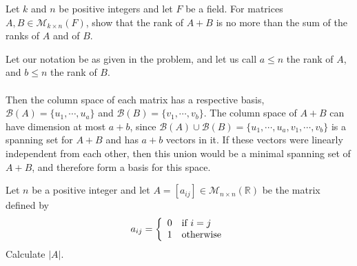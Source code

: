 \documentclass{article}
\begin{document}
\setcounter{problem}{621}
\begin{problem}
Let $k$ and $n$ be positive integers and let $F$ be a field. For matrices $A,B \in \mathcal{M}_{k\times n}(F)$, show that the rank of $A+B$ is no more than the sum of the ranks of $A$ and of $B$.
\end{problem}

\begin{solution}
Let our notation be as given in the problem, and let us call $a\le n$ the rank of $A$, and $b\le n$ the rank of $B$. 

\paragraph{}
Then the column space of each matrix has a respective basis, $\mathcal{B}(A) = \{ u_{1},\cdots,u_{a} \}$ and $\mathcal{B}(B) = \{ v_{1},\cdots,v_{b} \}$. The column space of $A+B$ can have dimension at most $a+b$, since $\mathcal{B}(A) \cup \mathcal{B}(B) =  \{ u_{1},\cdots,u_{a} ,v_{1},\cdots,v_{b} \}$ is a spanning set for $A+B$ and has $a+b$ vectors in it. If these vectors were linearly independent from each other, then this union would be a minimal spanning set of $A+B$, and therefore form a basis for this space.
\end{solution}

\setcounter{section}{11}
\setcounter{problem}{669}
\begin{problem}
Let $n$ be a positive integer and let $A=[a_{ij}] \in \mathcal{M}_{n\times n}(\mathbb{R})$ be the matrix defined by
\[
a_{ij} =
\left\{
\begin{array}{l l}
0 & \text{if }i=j\\
1 & \text{otherwise}
\end{array}
\right.
\]
Calculate $|A|$.
\end{problem}
\end{document}
